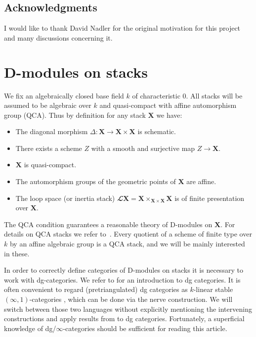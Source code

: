 \documentclass[english]{ck-article}
\let\stack\mathbf
\renewcommand\ls[1]{\mathbfcal{L} #1}
\begin{document}
\subsection*{Acknowledgments}
I would like to thank David Nadler for the original motivation for this project and many discussions concerning it.


\section{D-modules on stacks}
\label{sec:d-mods}

We fix an algebraically closed base field $k$ of characteristic $0$.
All stacks will be assumed to be algebraic over $k$ and quasi-compact with affine automorphism group (QCA).
Thus by definition for any stack $\stack X$ we have:
\begin{itemize}
    \item The diagonal morphism $Δ\colon \stack X → \stack X × \stack X$ is schematic.
    \item There exists a scheme $Z$ with a smooth and surjective map $Z → \stack X$.
    \item $\stack X$ is quasi-compact.
    \item The automorphism groups of the geometric points of $\stack X$ are affine.
    \item The loop space (or inertia stack) $\ls \stack X = \stack X ×_{\stack X × \stack X} \stack X$ is of finite presentation over $\stack X$.
\end{itemize}
The QCA condition guarantees a reasonable theory of D-modules on $\stack X$.
For details on QCA stacks we refer to~\cite{DrinfeldGaitsgory:2013:FinitenessQuestions}.
Every quotient of a scheme of finite type over $k$ by an affine algebraic group is a QCA stack, and we will be mainly interested in these.

In order to correctly define categories of D-modules on stacks it is necessary to work with dg-categories.
We refer to \cite{Keller:2006:OnDGCategories} for an introduction to dg categories.
It is often convenient to regard (pretriangulated) dg categories as $k$-linear stable $(∞,1)$-categories \cite{Lurie:2009:HigherToposTheory,Lurie:2014-draft:HigherAlgebra}, which can be done via the nerve construction.%
We will switch between those two languages without explicitly mentioning the intervening constructions and apply results from \cite{Lurie:2014-draft:HigherAlgebra} to dg categories.
Fortunately, a superficial knowledge of dg/$∞$-categories should be sufficient for reading this article.
\end{document}
